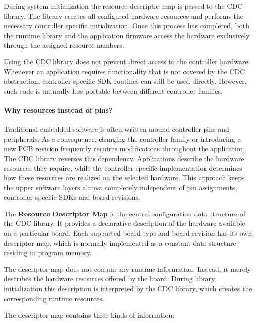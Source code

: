 During system initialization the resource descriptor map is passed to the CDC
library. The library creates all configured hardware resources and performs the
necessary controller specific initialization. Once this process has completed,
both the runtime library and the application firmware access the hardware
exclusively through the assigned resource numbers.

Using the CDC library does not prevent direct access to the controller hardware.
Whenever an application requires functionality that is not covered by the CDC
abstraction, controller specific SDK routines can still be used directly.
However, such code is naturally less portable between different controller
families.

\paragraph{Why resources instead of pins?}

Traditional embedded software is often written around controller pins and
peripherals. As a consequence, changing the controller family or introducing a
new PCB revision frequently requires modifications throughout the application.
The CDC library reverses this dependency. Applications describe the hardware
resources they require, while the controller specific implementation determines
how these resources are realized on the selected hardware. This approach keeps
the upper software layers almost completely independent of pin assignments,
controller specific SDKs and board revisions.


The \textbf{Resource Descriptor Map} is the central configuration data structure
of the CDC library. It provides a declarative description of the hardware
available on a particular board. Each supported board type and board revision
has its own descriptor map, which is normally implemented as a constant data
structure residing in program memory.

The descriptor map does not contain any runtime information. Instead, it merely
describes the hardware resources offered by the board. During library
initialization this description is interpreted by the CDC library, which creates
the corresponding runtime resources.

The descriptor map contains three kinds of information:

